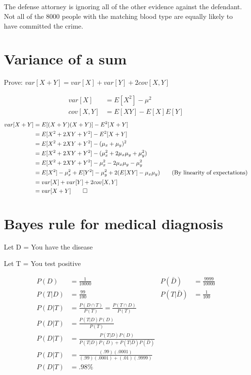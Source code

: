 \documentclass{article}
\begin{document}
\subsection{}

The defense attorney is ignoring all of the other evidence against the
defendant. Not all of the 8000 people with the matching blood type are
equally likely to have committed the crime.

\section{Variance of a sum}
Prove: $var[X + Y] = var[X] + var[Y] + 2cov[X,Y]$

\begin{align}
  var[X] &= E[X^2]-\mu^2 \\
  cov[X,Y] &= E[XY] - E[X]E[Y]
\end{align}
\begin{align*}
  var[X+Y] &= E[(X+Y)(X+Y)] - E^2[X+Y] \\
           &= E[X^2+2XY+Y^2] - E^2[X+Y] \\
           &= E[X^2+2XY+Y^2] - (\mu_x + \mu_y)^2 \\
           &= E[X^2+2XY+Y^2] - (\mu_x^2 + 2\mu_x\mu_y + \mu_y^2) \\
           &= E[X^2+2XY+Y^2] - \mu_x^2 - 2\mu_x\mu_y - \mu_y^2 \\
           &= E[X^2] - \mu_x^2 + E[Y^2] - \mu_y^2 + 2(E[XY]-\mu_x\mu_y)
             \text{\qquad(By linearity of expectations)}\\
           &= var[X] + var[Y] + 2cov[X,Y] \\
           &= var[X + Y] \qed
\end{align*}

\section{Bayes rule for medical diagnosis}

\begin{list}{}{}
\item Let D = You have the disease
\item Let T = You test positive
\end{list}

\begin{align*}
  P(D) &= \frac{1}{10000} & P(\bar{D}) &= \frac{9999}{10000} \\
  P(T|D) &= \frac{99}{100} & P(T|\bar{D}) &= \frac{1}{100} \\
  P(D|T) &= \frac{P(D \cap T)}{P(T)} = \frac{P(T \cap D)}{P(T)} \\
  P(D|T) &= \frac{P(T|D)P(D)}{P(T)} \\
  P(D|T) &= \frac{P(T|D)P(D)}{P(T|D)P(D) + P(T|\bar{D})P(\bar{D})} \\
  P(D|T) &= \frac{(.99)(.0001)}{(.99)(.0001) + (.01)(.9999)} \\
  P(D|T) &= .98\%
\end{align*}
\end{document}
